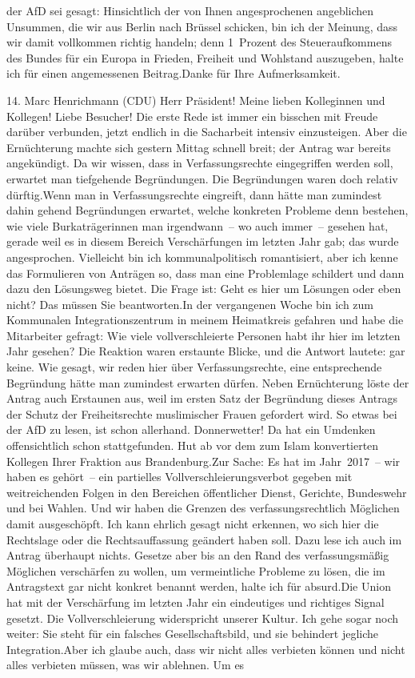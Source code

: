 \documentclass{article}
\begin{document}
der AfD sei gesagt: Hinsichtlich der von Ihnen angesprochenen angeblichen Unsummen, die wir aus Berlin nach Brüssel schicken, bin ich der Meinung, dass wir damit vollkommen richtig handeln; denn 1 Prozent des Steueraufkommens des Bundes für ein Europa in Frieden, Freiheit und Wohlstand auszugeben, halte ich für einen angemessenen Beitrag.Danke für Ihre Aufmerksamkeit.




	14. Marc Henrichmann (CDU) Herr Präsident! Meine lieben Kolleginnen und Kollegen! Liebe Besucher! Die erste Rede ist immer ein bisschen mit Freude darüber verbunden, jetzt endlich in die Sacharbeit intensiv einzusteigen. Aber die Ernüchterung machte sich gestern Mittag schnell breit; der Antrag war bereits angekündigt. Da wir wissen, dass in Verfassungsrechte eingegriffen werden soll, erwartet man tiefgehende Begründungen. Die Begründungen waren doch relativ dürftig.Wenn man in Verfassungsrechte eingreift, dann hätte man zumindest dahin gehend Begründungen erwartet, welche konkreten Probleme denn bestehen, wie viele Burkaträgerinnen man irgendwann – wo auch immer – gesehen hat, gerade weil es in diesem Bereich Verschärfungen im letzten Jahr gab; das wurde angesprochen. Vielleicht bin ich kommunalpolitisch romantisiert, aber ich kenne das Formulieren von Anträgen so, dass man eine Problemlage schildert und dann dazu den Lösungsweg bietet. Die Frage ist: Geht es hier um Lösungen oder eben nicht? Das müssen Sie beantworten.In der vergangenen Woche bin ich zum Kommunalen Integrationszentrum in meinem Heimatkreis gefahren und habe die Mitarbeiter gefragt: Wie viele vollverschleierte Personen habt ihr hier im letzten Jahr gesehen? Die Reaktion waren erstaunte Blicke, und die Antwort lautete: gar keine. Wie gesagt, wir reden hier über Verfassungsrechte, eine entsprechende Begründung hätte man zumindest erwarten dürfen. Neben Ernüchterung löste der Antrag auch Erstaunen aus, weil im ersten Satz der Begründung dieses Antrags der Schutz der Freiheitsrechte muslimischer Frauen gefordert wird. So etwas bei der AfD zu lesen, ist schon allerhand. Donnerwetter! Da hat ein Umdenken offensichtlich schon stattgefunden. Hut ab vor dem zum Islam konvertierten Kollegen Ihrer Fraktion aus Brandenburg.Zur Sache: Es hat im Jahr 2017 – wir haben es gehört – ein partielles Vollverschleierungsverbot gegeben mit weitreichenden Folgen in den Bereichen öffentlicher Dienst, Gerichte, Bundeswehr und bei Wahlen. Und wir haben die Grenzen des verfassungsrechtlich Möglichen damit ausgeschöpft. Ich kann ehrlich gesagt nicht erkennen, wo sich hier die Rechtslage oder die Rechtsauffassung geändert haben soll. Dazu lese ich auch im Antrag überhaupt nichts. Gesetze aber bis an den Rand des verfassungsmäßig Möglichen verschärfen zu wollen, um vermeintliche Probleme zu lösen, die im Antragstext gar nicht konkret benannt werden, halte ich für absurd.Die Union hat mit der Verschärfung im letzten Jahr ein eindeutiges und richtiges Signal gesetzt. Die Vollverschleierung widerspricht unserer Kultur. Ich gehe sogar noch weiter: Sie steht für ein falsches Gesellschaftsbild, und sie behindert jegliche Integration.Aber ich glaube auch, dass wir nicht alles verbieten können und nicht alles verbieten müssen, was wir ablehnen. Um es 
\end{document}
